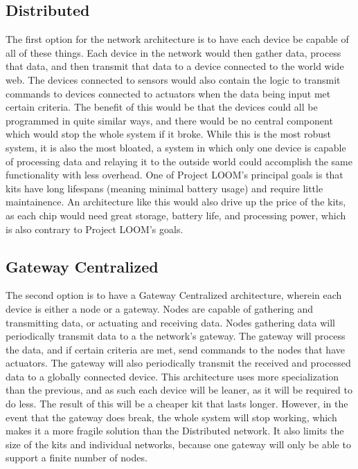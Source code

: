 \documentclass[onecolumn, draftclsnofoot,10pt, compsoc]{IEEEtran}
\begin{document}
	\subsection{Distributed}
	The first option for the network architecture is to have each device be capable of all
	of these things. Each device in the network would then gather data, process that data,
	and then transmit that data to a device connected to the world wide web. The devices 
	connected to sensors would also contain the logic to transmit commands to devices
	connected to actuators when the data being input met certain criteria. The benefit
	of this would be that the devices could all be programmed in quite similar ways, and
	there would be no central component which would stop the whole system if it broke. While
	this is the most robust system, it is also the most bloated, a system in which only
	one device is capable of processing data and relaying it to the outside world could
	accomplish the same functionality with less overhead. One of Project LOOM's principal
	goals is that kits have long lifespans (meaning minimal battery usage) and require
	little maintainence. An architecture like this would also drive up the price of the kits,
	as each chip would need great storage, battery life, and processing power, which is also
	contrary to Project LOOM's goals.
	\subsection{Gateway Centralized}
	The second option is to have a Gateway Centralized architecture, wherein each device is
	either a node or a gateway. Nodes are capable of gathering and transmitting data, or 
	actuating and receiving data. Nodes gathering data will periodically transmit data to
	a the network's gateway. The gateway will process the data, and if certain criteria are
	met, send commands to the nodes that have actuators. The gateway will also periodically
	transmit the received and processed data to a globally connected device. This architecture
	uses more specialization than the previous, and as such each device will be leaner, as it
	will be required to do less. The result of this will be a cheaper kit that lasts longer. 
	However, in the event that the gateway does break, the whole system will stop working,
	which makes it a more fragile solution than the Distributed network. It also limits the 
	size of the kits and individual networks, because one gateway will only be able to support
	a finite number of nodes. 
\end{document}
